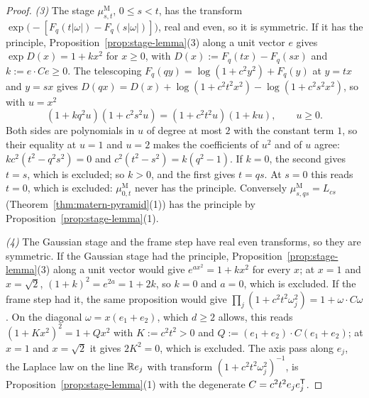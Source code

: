 \begin{proof}
\emph{(3)} The stage $\mu^{\mathrm M}_{s,t}$, $0 \le s < t$, has the transform
$\exp\bigl(-[F_q(t|\omega|) - F_q(s|\omega|)]\bigr)$, real and even, so it is symmetric. If it
has the principle, Proposition~\ref{prop:stage-lemma}(3) along a unit vector $e$ gives
$\exp D(x) = 1 + kx^2$ for $x \ge 0$, with $D(x) := F_q(tx) - F_q(sx)$ and
$k := e\cdot Ce \ge 0$. The telescoping $F_q(qy) = \log(1 + c^2y^2) + F_q(y)$ at $y = tx$ and
$y = sx$ gives $D(qx) = D(x) + \log(1 + c^2t^2x^2) - \log(1 + c^2s^2x^2)$, so with $u = x^2$
\[
  (1 + kq^2u)(1 + c^2s^2u) = (1 + c^2t^2u)(1 + ku) , \qquad u \ge 0 .
\]
Both sides are polynomials in $u$ of degree at most $2$ with the constant term $1$, so their equality at $u = 1$ and $u = 2$ makes the coefficients of $u^2$ and of $u$ agree:
$kc^2(t^2 - q^2s^2) = 0$ and $c^2(t^2 - s^2) = k(q^2 - 1)$. If $k = 0$, the second gives $t = s$,
which is excluded; so $k > 0$, and the first gives $t = qs$. At $s = 0$ this reads $t = 0$, which is
excluded: $\mu^{\mathrm M}_{0,t}$ never has the principle. Conversely
$\mu^{\mathrm M}_{s,qs} = L_{cs}$ (Theorem~\ref{thm:matern-pyramid}(1)) has the principle by
Proposition~\ref{prop:stage-lemma}(1).

\emph{(4)} The Gaussian stage and the frame step have real even transforms, so they are symmetric.
If the Gaussian stage had the principle, Proposition~\ref{prop:stage-lemma}(3) along a unit vector
would give $e^{ax^2} = 1 + kx^2$ for every $x$; at $x = 1$ and $x = \sqrt2$,
$(1 + k)^2 = e^{2a} = 1 + 2k$, so $k = 0$ and $a = 0$, which is excluded. If the frame step had it,
the same proposition would give $\prod_j(1 + c^2t^2\omega_j^2) = 1 + \omega\cdot C\omega$. On the
diagonal $\omega = x(e_1 + e_2)$, which $d \ge 2$ allows, this reads
$(1 + Kx^2)^2 = 1 + Qx^2$ with $K := c^2t^2 > 0$ and $Q := (e_1 + e_2)\cdot C(e_1 + e_2)$; at
$x = 1$ and $x = \sqrt2$ it gives $2K^2 = 0$, which is excluded. The axis pass along $e_j$, the
Laplace law on the line $\mathbb{R} e_j$ with transform $(1 + c^2t^2\omega_j^2)^{-1}$, is
Proposition~\ref{prop:stage-lemma}(1) with the degenerate $C = c^2t^2e_je_j^{\mathsf{T}}$.
\end{proof}

